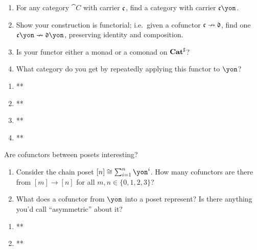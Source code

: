 \documentclass[Book-Poly]{subfiles}
\begin{document}
\begin{exercise}
\begin{enumerate}
	\item For any category $\cat{C}$ with carrier $\mathfrak{c}$, find a category with carrier $\ema{c}\yon$.
	\item Show your construction is functorial; i.e.\ given a cofunctor $\mathfrak{c}\nrightarrow\mathfrak{d}$, find one $\ema{c}\yon\cof\ema{d}\yon$, preserving identity and composition.
	\item Is your functor either a monad or a comonad on $\mathbf{Cat}^\sharp$?
	\item What category do you get by repeatedly applying this functor to $\yon$?
\qedhere
\end{enumerate}
\begin{solution}
\begin{enumerate}
    \item **
    \item **
    \item **
    \item **
\end{enumerate}
\end{solution}
\end{exercise}

\begin{exercise}
Are cofunctors between posets interesting?
\begin{enumerate}
	\item Consider the chain poset $[n]\cong\sum_{i=1}^n\yon^i$. How many cofunctors are there from $[m]\to[n]$ for all $m,n\in\{0,1,2,3\}$?
	\item What does a cofunctor from $\yon$ into a poset represent? Is there anything you'd call ``asymmetric'' about it?
\qedhere
\end{enumerate}
\begin{solution}
\begin{enumerate}
    \item **
    \item **
\end{enumerate}
\end{solution}
\end{exercise}
\end{document}
